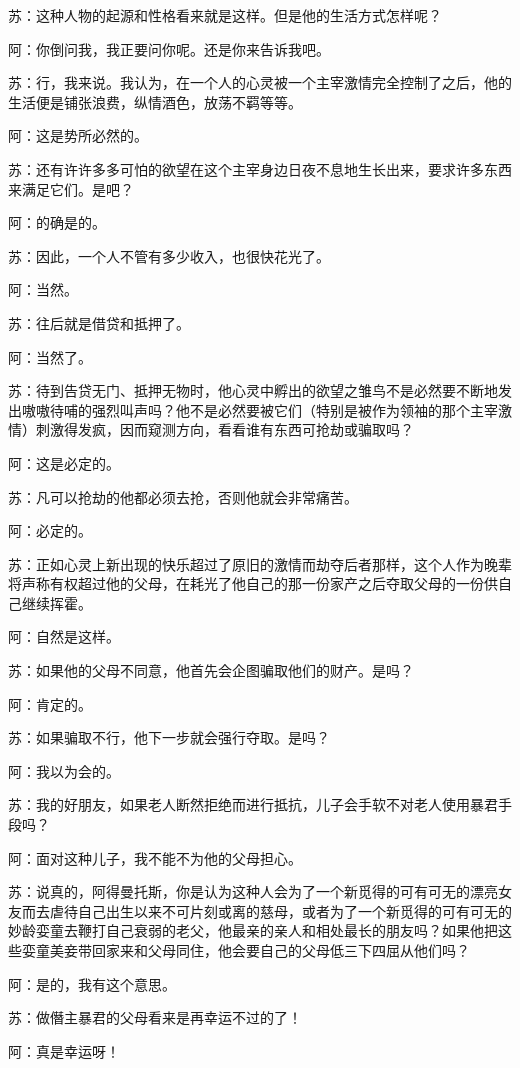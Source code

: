 \documentclass[12pt,oneside]{book}
\begin{document}
苏：这种人物的起源和性格看来就是这样。但是他的生活方式怎样呢？

阿：你倒问我，我正要问你呢。还是你来告诉我吧。

苏：行，我来说。我认为，在一个人的心灵被一个主宰激情完全控制了之后，他的生活便是铺张浪费，纵情酒色，放荡不羁等等。

阿：这是势所必然的。

苏：还有许许多多可怕的欲望在这个主宰身边日夜不息地生长出来，要求许多东西来满足它们。是吧？

阿：的确是的。

苏：因此，一个人不管有多少收入，也很快花光了。

阿：当然。

苏：往后就是借贷和抵押了。

阿：当然了。

苏：待到告贷无门、抵押无物时，他心灵中孵出的欲望之雏鸟不是必然要不断地发出嗷嗷待哺的强烈叫声吗？他不是必然要被它们（特别是被作为领袖的那个主宰激情）刺激得发疯，因而窥测方向，看看谁有东西可抢劫或骗取吗？

阿：这是必定的。

苏：凡可以抢劫的他都必须去抢，否则他就会非常痛苦。

阿：必定的。

苏：正如心灵上新出现的快乐超过了原旧的激情而劫夺后者那样，这个人作为晚辈将声称有权超过他的父母，在耗光了他自己的那一份家产之后夺取父母的一份供自己继续挥霍。

阿：自然是这样。

苏：如果他的父母不同意，他首先会企图骗取他们的财产。是吗？

阿：肯定的。

苏：如果骗取不行，他下一步就会强行夺取。是吗？

阿：我以为会的。

苏：我的好朋友，如果老人断然拒绝而进行抵抗，儿子会手软不对老人使用暴君手段吗？

阿：面对这种儿子，我不能不为他的父母担心。

苏：说真的，阿得曼托斯，你是认为这种人会为了一个新觅得的可有可无的漂亮女友而去虐待自己出生以来不可片刻或离的慈母，或者为了一个新觅得的可有可无的妙龄娈童去鞭打自己衰弱的老父，他最亲的亲人和相处最长的朋友吗？如果他把这些娈童美妾带回家来和父母同住，他会要自己的父母低三下四屈从他们吗？

阿：是的，我有这个意思。

苏：做僭主暴君的父母看来是再幸运不过的了！

阿：真是幸运呀！
\end{document}
